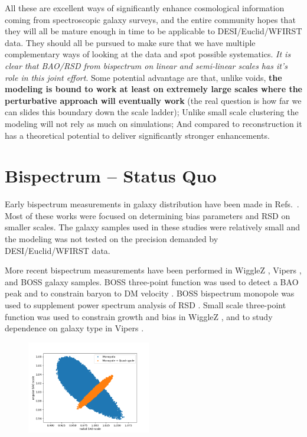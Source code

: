 All these are excellent ways of significantly enhance cosmological information
coming from spectroscopic galaxy surveys, and the entire community hopes that
they will all be mature enough in time to be applicable to DESI/Euclid/WFIRST
data.  They should all be pursued to make sure that we have multiple
complementary ways of looking at the data and spot possible systematics.
\textit{It is clear that BAO/RSD from bispectrum on linear and semi-linear
scales has it's role in this joint effort}. Some potential advantage are that,
unlike voids, \textbf{the modeling is bound to work at least on extremely large
scales where the perturbative approach will eventually work} (the real question
is how far we can slides this boundary down the scale ladder); Unlike small
scale clustering the modeling will not rely as much on simulations; And
compared to reconstruction it has a theoretical potential to deliver
significantly stronger enhancements.

\section{Bispectrum -- Status Quo}
\label{sec:statusquo}
Early bispectrum measurements in galaxy distribution have been made in
Refs.~\cite{2014ApJ...780..139G,2011ApJ...739...85M,2011ApJ...726...13M,2009MNRAS.399..801G,2007MNRAS.378.1196K,2006MNRAS.368.1507N,2005MNRAS.364..620G,2005MNRAS.361..824G,2004PASJ...56..415K,2004ApJ...607..140J,2002MNRAS.335..432V,1975ApJ...196....1P}.
Most of these works were focused on determining bias parameters and RSD on
smaller scales. The galaxy samples used in these studies were relatively small
and the modeling was not tested on the precision demanded by DESI/Euclid/WFIRST
data.

More recent bispectrum measurements have been performed in WiggleZ
\cite{2010MNRAS.401.1429D}, Vipers \cite{2014A&A...562A..23G}, and BOSS
\cite{2016MNRAS.455.1553R} galaxy samples. BOSS three-point function was used
to detect a BAO peak \cite{2017MNRAS.469.1738S} and to constrain baryon to DM
velocity \cite{2016arXiv160706098S}. BOSS bispectrum monopole was used to
supplement power spectrum analysis of RSD
\cite{2017MNRAS.465.1757G,2015MNRAS.452.1914G,2015MNRAS.451..539G}. Small scale
three-point function was used to constrain growth and bias in WiggleZ
\cite{2013MNRAS.432.2654M}, and to study dependence on galaxy type in Vipers
\cite{2017A&A...604A.133M}.

\begin{figure}
\begin{center}
\includegraphics[width=0.48\textwidth]{prelimMCMC.png}
\end{center}
\end{figure}

